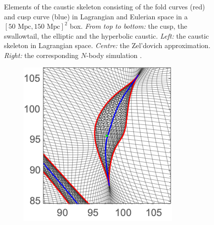 \documentclass[a4paper, 11pt]{article}
\begin{document}
\begin{figure}
\begin{subfigure}[b]{0.28\textwidth}
\end{subfigure}
\caption{Elements of the caustic skeleton consisting of the fold curves (red) and cusp curve (blue) in Lagrangian and Eulerian space in a $[50\text{ Mpc}, 150 \text{ Mpc}]^2$ box. \textit{From top to bottom:} the cusp, the swallowtail, the elliptic and the hyperbolic caustic. \textit{Left:} the caustic skeleton in Lagrangian space. \textit{Centre:} the Zel'dovich approximation. \textit{Right:} the corresponding $N$-body simulation \cite{Hidding:2020}.}\label{fig:caustics_Examples_Big}
\end{figure}




\begin{figure}
\centering
\begin{subfigure}[b]{0.24\textwidth}
\includegraphics[width=\textwidth]{Cusp_Z_Zoom}
\end{subfigure}~
\begin{subfigure}[b]{0.24\textwidth}

\end{subfigure}
\end{figure}
\end{document}
